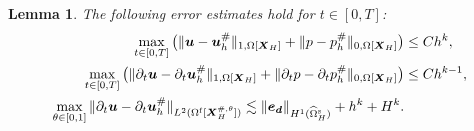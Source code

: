 \documentclass[11pt,reqno]{amsart}
\theoremstyle{definition}
\theoremstyle{plain}
\newtheorem{lemma}{Lemma}[section]
\numberwithin{theorem}{section}
\numberwithin{proposition}{section}
\numberwithin{lemma}{section}
\numberwithin{equation}{section}
\newcommand{\bs}[1]{\boldsymbol{#1}}
\renewcommand{\(}{\bigl(}
\renewcommand{\)}{\bigr)}
\begin{document}
\begin{lemma}\label{Lemma:Ritz}
The following error estimates hold for $t\in[0,T]$: 
\begin{subequations}
\begin{align}
\max_{t\in[0,T]} \big( \|{\bs u}-{\bs u}_h^\#\|_{1,\Omega[\bs X_H]} 
+ \|p-p_h^\#\|_{0,\Omega[\bs X_H]} \big)
&\le Ch^k , \label{Ritz-H1}\\
\max_{t\in[0,T]} \big( \|\partial_t{\bs u}-\partial_t{\bs u}_h^\#\|_{1,\Omega[\bs X_H]} 
+ \|\partial_tp-\partial_tp_h^\#\|_{0,\Omega[\bs X_H]} \big)
&\le Ch^{k-1} ,\label{Ritz-dt-H1}\\
\max_{\theta\in[0,1]} \|\partial_t{\bs u}-\partial_t{\bs u}_h^\#\|_{L^2(\Omega^{\rm f}[{\bs X}_H^{\#,\theta}])} 
\lesssim \|{\bs e}_{\bs d}\|_{H^1(\widehat\Omega^{\rm s}_H)}
+ h^k + H^k .  \label{Ritz-L2}
\end{align}
\end{subequations}
\end{lemma}
\end{document}
